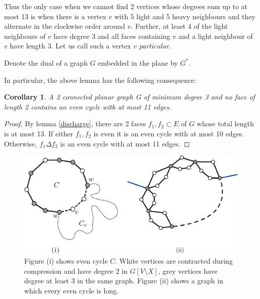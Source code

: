 \documentclass{article}
\newcommand{\0}{\mathbb{0}}
\newcommand{\1}{\mathbb{1}}
\newtheorem{cor}[theorem]{Corollary}
\begin{document}
Thus the only case when we cannot find 2 vertices whose degrees sum up to at most 13 is when there is a vertex $v$ with 5 light and 5 heavy neighbours and they alternate in the clockwise order around $v$. Further, at least 4 of the light neighbours of $v$ have degree 3 and all faces containing  $v$ and a light neighbour of $v$ have length 3. Let us call such a vertex $v$ \emph{particular}.

Denote the dual of a graph $G$ embedded in the plane by $G^*$.   %

In particular, the above lemma has the following consequence:

\begin{cor}\label{cor:smallec}
  A 2 connected planar graph G of minimum degree 3 and no face of
  length 2 contains an even cycle with at most 11 edges.
\end{cor}
\begin{proof}
By lemma \ref{discharge}, there are 2 faces $f_1,f_2 \subset E$ of $G$ whose total length is at most 13. If either $f_1,f_2$ is even it is an even cycle with at most 10 edges. Otherwise,  $f_1 \Delta f_2$ is an even cycle with at most 11 edges.
\end{proof}


\begin{figure}
  \begin{center}
    \includegraphics[width=.9\textwidth]{simple-pd.pdf}
  \end{center}
  \caption{\label{fig:simplepd} Figure (i) shows even cycle
    $C$. White vertices are contracted during compression and have
    degree 2 in $G[V\setminus X]$, grey vertices have degree at least
    3 in the same graph. Figure (ii) shows a graph in which every even cycle is long. }
\end{figure}
\end{document}
